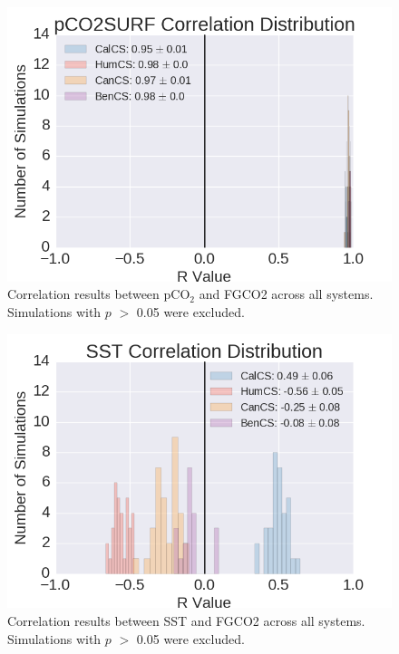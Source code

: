 \documentclass[12pt]{article}
\begin{document}
\clearpage
\begin{figure}[!h]
	\centering
	\includegraphics[width=29pc]{../../figs/all-systems/histograms/pCO2SURF-correlation-distributions.png}
	\caption{Correlation results between pCO$_{2}$ and FGCO2 across all systems. Simulations with $p$ $>$ 0.05 were excluded.}
	\label{fig:pCO2-histograms}
\end{figure}
\begin{figure}[!h]
	\centering
	\includegraphics[width=29pc]{../../figs/all-systems/histograms/SST-correlation-distributions.png}
	\caption{Correlation results between SST and FGCO2 across all systems. Simulations with $p$ $>$ 0.05 were excluded.}
	\label{fig:SST-histograms}
\end{figure}
\end{document}
